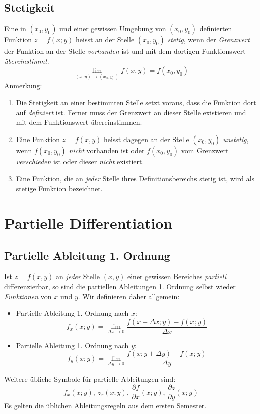 \subsection{Stetigkeit}
\begin{definition}
Eine in $(x_0,y_0)$ und einer gewissen Umgebung von $(x_0,y_0)$ definierten Funktion $z = f(x;y)$ heisst an der Stelle $(x_0,y_0)$ \textit{stetig}, wenn der \textit{Grenzwert} der Funktion an der Stelle \textit{vorhanden} ist und mit dem dortigen Funktionswert \textit{übereinstimmt}.
$$\lim\limits_{(x,y) \rightarrow (x_0,y_0)} f(x,y) = f(x_0,y_0)$$
Anmerkung:
\begin{enumerate}
\item Die Stetigkeit an einer bestimmten Stelle setzt voraus, dass die Funktion dort auf \textit{definiert} ist. Ferner muss der Grenzwert an dieser Stelle existieren und mit dem Funktionswert übereinstimmen.
\item Eine Funktion $z = f(x,y)$ heisst dagegen an der Stelle $(x_0,y_0)$ \textit{unstetig}, wenn  $f(x_0,y_0)$ \textit{nicht} vorhanden ist oder $f(x_0,y_0)$ vom Grenzwert \textit{verschieden} ist oder dieser \textit{nicht} existiert.
\item Eine Funktion, die an \textit{jeder} Stelle ihres Definitionsbereichs stetig ist, wird als stetige Funktion bezeichnet.
\end{enumerate}
\end{definition}

\section{Partielle Differentiation}
\subsection{Partielle Ableitung 1. Ordnung}
\begin{definition}
Ist $z = f(x,y)$ an \textit{jeder} Stelle $(x,y)$ einer gewissen Bereiches \textit{partiell} differenzierbar, so sind die partiellen Ableitungen 1. Ordnung selbst wieder \textit{Funktionen} von $x$ und $y$. Wir definieren daher allgemein:
\begin{itemize}
\item Partielle Ableitung 1. Ordnung nach $x$:
$$ f_x(x;y) = \lim\limits_{\Delta x \rightarrow 0} \frac{f(x+\Delta x; y) - f(x;y)}{\Delta x}$$
\item Partielle Ableitung 1. Ordnung nach $y$:
$$ f_y(x;y) = \lim\limits_{\Delta y \rightarrow 0} \frac{f(x;y +\Delta y) - f(x;y)}{\Delta y}$$
\end{itemize}
Weitere übliche Symbole für partielle Ableitungen sind:
$$f_x(x;y) \text{, } z_x(x;y) \text{, } \frac{\partial f}{\partial x} (x;y) \text{, } \frac{\partial z}{\partial y} (x;y)$$
Es gelten die üblichen Ableitungsregeln aus dem ersten Semester.
\end{definition}

